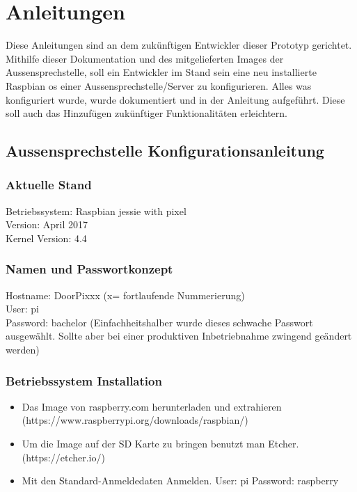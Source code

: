 \section{Anleitungen}
\label{sec:anleitungen}
Diese Anleitungen sind an dem zukünftigen Entwickler dieser Prototyp gerichtet. Mithilfe dieser Dokumentation und des mitgelieferten Images der Aussensprechstelle, soll ein Entwickler im Stand sein eine neu installierte Raspbian \gls{os} einer Aussensprechstelle/Server zu konfigurieren. Alles was konfiguriert wurde, wurde dokumentiert und in der Anleitung aufgeführt. Diese soll auch das Hinzufügen zukünftiger Funktionalitäten erleichtern.

\subsection{Aussensprechstelle Konfigurationsanleitung}

\subsubsection{Aktuelle Stand}
Betriebssystem:	Raspbian jessie with pixel\\
Version: April 2017\\
Kernel Version: 4.4

\subsubsection{Namen und Passwortkonzept}
Hostname: DoorPixxx (x= fortlaufende Nummerierung)\\
User: pi\\
Password: bachelor (Einfachheitshalber wurde dieses schwache Passwort ausgewählt. Sollte aber bei einer produktiven Inbetriebnahme zwingend geändert werden)\\

\subsubsection{Betriebssystem Installation}
\begin{itemize}
	\item Das Image von raspberry.com herunterladen und extrahieren (https://www.raspberrypi.org/downloads/raspbian/)
	\item Um die Image auf der SD Karte zu bringen benutzt man Etcher.  (https://etcher.io/)
	\item Mit den Standard-Anmeldedaten Anmelden. User: pi Password: raspberry
\end{itemize}



